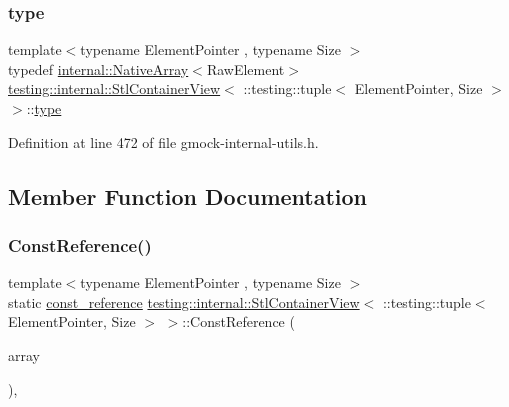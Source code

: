 \subsubsection{\texorpdfstring{type}{type}}
{\footnotesize\ttfamily template$<$typename Element\+Pointer , typename Size $>$ \\
typedef \hyperlink{classtesting_1_1internal_1_1NativeArray}{internal\+::\+Native\+Array}$<$Raw\+Element$>$ \hyperlink{classtesting_1_1internal_1_1StlContainerView}{testing\+::internal\+::\+Stl\+Container\+View}$<$ \+::testing\+::tuple$<$ Element\+Pointer, Size $>$ $>$\+::\hyperlink{classtesting_1_1internal_1_1StlContainerView_3_01_1_1testing_1_1tuple_3_01ElementPointer_00_01Size_01_4_01_4_aedefb897170f76518afbca6f87b5467c}{type}}



Definition at line 472 of file gmock-\/internal-\/utils.\+h.



\subsection{Member Function Documentation}
\mbox{\label{classtesting_1_1internal_1_1StlContainerView_3_01_1_1testing_1_1tuple_3_01ElementPointer_00_01Size_01_4_01_4_aba9be6fade312dd735ac47a3cb8cc355}} 
\subsubsection{\texorpdfstring{Const\+Reference()}{ConstReference()}}
{\footnotesize\ttfamily template$<$typename Element\+Pointer , typename Size $>$ \\
static \hyperlink{classtesting_1_1internal_1_1StlContainerView_3_01_1_1testing_1_1tuple_3_01ElementPointer_00_01Size_01_4_01_4_a4c69a4e22173b0e6f3eb55636d6a38f1}{const\+\_\+reference} \hyperlink{classtesting_1_1internal_1_1StlContainerView}{testing\+::internal\+::\+Stl\+Container\+View}$<$ \+::testing\+::tuple$<$ Element\+Pointer, Size $>$ $>$\+::Const\+Reference (\begin{DoxyParamCaption}\item[{const \+::testing\+::tuple$<$ Element\+Pointer, Size $>$ \&}]{array }\end{DoxyParamCaption})\hspace{0.3cm}{\ttfamily [inline]}, {\ttfamily [static]}}




